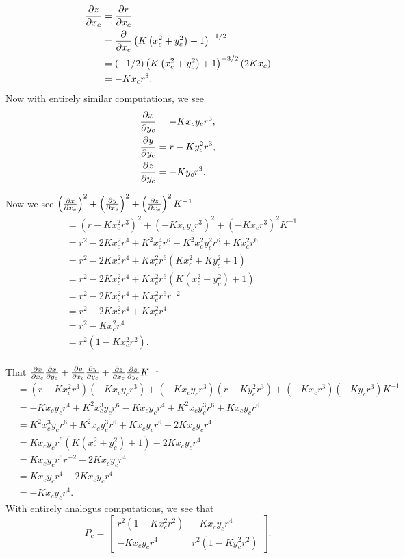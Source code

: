 \documentclass{ximera}
\begin{document}
\begin{problem}
\begin{freeResponse}
\begin{align*}
    \pp[z]{x_c} &= \pp[r]{x_c}\\
    &= \pp{x_c}\left(K\left(x_c^2 + y_c^2\right)+1\right)^{-1/2}\\
    &= (-1/2)\left(K\left(x_c^2 + y_c^2\right)+1\right)^{-3/2}(2Kx_c)\\
    &= -Kx_c r^3.
    \end{align*}
    Now with entirely similar computations, we see
    \begin{align*}
      \pp[x]{y_c} &= -Kx_cy_c r^3,\\
      \pp[y]{y_c} &= r - Ky_c^2 r^3,\\
      \pp[z]{y_c} &= -Ky_c r^3.
    \end{align*}


    
    Now we see $\left(\pp[x]{x_c}\right)^2 + \left(\pp[y]{x_c}\right)^2 + \left(\pp[z]{x_c}\right)^2K^{-1}$
    \begin{align*}
      &= \left(r -Kx_c^2 r^3\right)^2 + \left(-Kx_cy_c r^3\right)^2 + \left(-Kx_c r^3\right)^2K^{-1}\\
      &= r^2 - 2Kx_c^2r^4 + K^2x_c^4 r^6+ K^2x_c^2y_c^2r^6 + Kx_c^2r^6\\
      &= r^2 - 2Kx_c^2r^4 + Kx_c^2r^6\left(Kx_c^2 + Ky_c^2 + 1\right)\\
      &= r^2 - 2Kx_c^2r^4 + Kx_c^2r^6\left(K\left(x_c^2 + y_c^2\right) + 1\right)\\
      &= r^2 - 2Kx_c^2r^4 + Kx_c^2r^6 r^{-2}\\
      &= r^2 - 2Kx_c^2r^4 + Kx_c^2r^4\\
      &= r^2 - Kx_c^2r^4\\
      &= r^2(1 - Kx_c^2r^2).\\
    \end{align*}
    
    That $\pp[x]{x_c}\pp[x]{y_c} + \pp[y]{x_c}\pp[y]{y_c} + \pp[z]{x_c}\pp[z]{y_c} K^{-1}$
    \begin{align*}
      &=\left(r -Kx_c^2 r^3\right)\left(-Kx_cy_c r^3\right) + \left(-Kx_cy_c r^3\right)\left(r - Ky_c^2 r^3\right) + \left(-Kx_c r^3\right)\left(-Ky_c r^3\right)K^{-1}\\
      &= -Kx_cy_cr^4+K^2x_c^3y_cr^6-Kx_cy_cr^4+K^2x_cy_c^3r^6+Kx_cy_cr^6\\
      &= K^2x_c^3y_cr^6+K^2x_cy_c^3r^6+Kx_cy_cr^6 -2Kx_cy_cr^4\\
      &= Kx_cy_cr^6\left(K\left(x_c^2 + y_c^2\right) + 1\right)-2Kx_cy_cr^4\\
      &= Kx_cy_cr^6r^{-2} -2Kx_cy_cr^4\\
      &= Kx_cy_cr^4 -2Kx_cy_cr^4\\
      &= -Kx_cy_cr^4.
    \end{align*}
    With entirely analogus computations, we see that 
    \[
     P_c =
     \begin{bmatrix}
       r^{2}\left( 1-Kx_{c}^{2}r^2\right) & -Kx_{c}y_{c}r^4\\
       -Kx_{c}y_{c}r^4 & r^{2}\left(1-Ky_{c}^{2}r^2\right)
     \end{bmatrix}.
     \]
  \end{freeResponse}
\end{problem}
\end{document}
